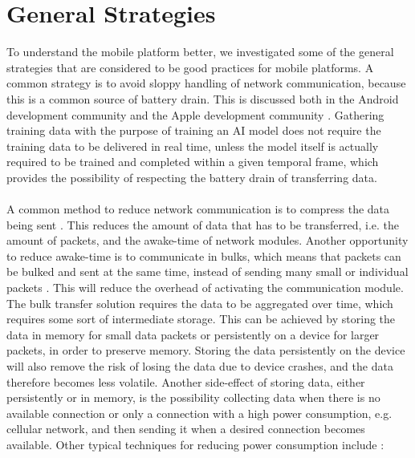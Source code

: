 
\section{General Strategies}
\label{sec:general_strategies}
To understand the mobile platform better, we investigated some of the general strategies that are considered to be good practices for mobile platforms. A common strategy is to avoid sloppy handling of network communication, because this is a common source of battery drain. This is discussed both in the Android development community \parencite{android_network_scheduling} and the Apple development community \parencite{iphone_network_scheduling}. Gathering training data with the purpose of training an AI model does not require the training data to be delivered in real time, unless the model itself is actually required to be trained and completed within a given temporal frame, which provides the possibility of respecting the battery drain of transferring data. 
\\\\
A common method to reduce network communication is to compress the data being sent \parencite{har_wearables}\parencite{android_network_scheduling}. This reduces the amount of data that has to be transferred, i.e. the amount of packets, and the awake-time of network modules. Another opportunity to reduce awake-time is to communicate in bulks, which means that packets can be bulked and sent at the same time, instead of sending many small or individual packets \parencite{android_network_scheduling}. This will reduce the overhead of activating the communication module. The bulk transfer solution requires the data to be aggregated over time, which requires some sort of intermediate storage. This can be achieved by storing the data in memory for small data packets or persistently on a device for larger packets, in order to preserve memory. Storing the data persistently on the device will also remove the risk of losing the data due to device crashes, and the data therefore becomes less volatile. Another side-effect of storing data, either persistently or in memory, is the possibility collecting data when there is no available connection or only a connection with a high power consumption, e.g. cellular network, and then sending it when a desired connection becomes available. Other typical techniques for reducing power consumption include \parencite{android_network_scheduling}:

